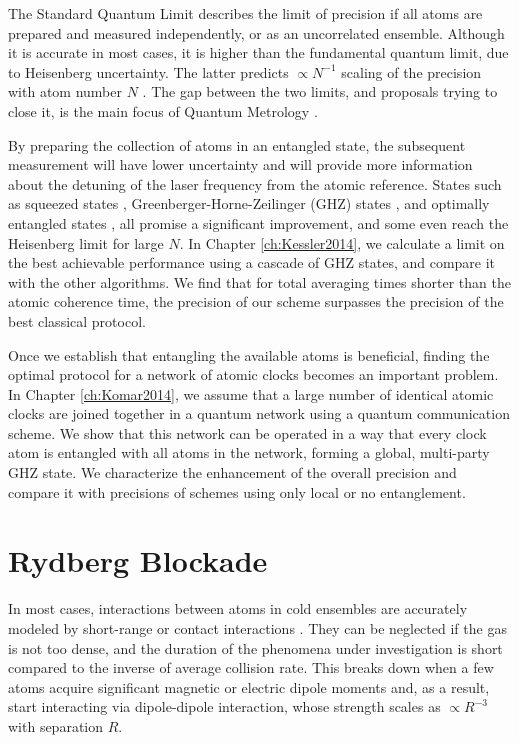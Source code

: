 The Standard Quantum Limit describes the limit of precision if all atoms are
prepared and measured independently, or as an uncorrelated ensemble. Although it
is accurate in most cases, it is higher than the fundamental quantum limit, due
to Heisenberg uncertainty. The latter predicts $\propto N^{-1}$ scaling of the
precision with atom number $N$ \cite{Hall2012}. The gap between the
two limits, and proposals trying to close it, is the main focus of
Quantum Metrology \cite{Giovanetti2011, Escher:2011fn}.

By preparing the collection of atoms in an
entangled state, the subsequent measurement will have lower uncertainty and will
provide more information about the detuning of the laser frequency from the
atomic reference. States such as squeezed states \cite{Andre2004,
Borregaard2013_nearHeisenberg}, Greenberger-Horne-Zeilinger (GHZ) states
\cite{Wineland1998, Bollinger1996}, and optimally entangled states
\cite{Buzek1999, Berry2009}, all promise a significant improvement, and some
even reach the Heisenberg limit for large $N$. In Chapter \ref{ch:Kessler2014},
we calculate a limit on the best achievable performance using a cascade of GHZ
states, and compare it with the other algorithms. We find that for total
averaging times shorter than the atomic coherence time, the precision of our
scheme surpasses the precision of the best classical protocol.

Once we establish that entangling the available atoms is beneficial, finding the
optimal protocol for a network of atomic clocks becomes an important problem. In
Chapter \ref{ch:Komar2014}, we assume that a large number of identical atomic
clocks are joined together in a quantum network using a quantum communication
scheme. We show that this network can be operated in a way that every clock
atom is entangled with all atoms in the network, forming a global, multi-party
GHZ state. We characterize the enhancement of the overall precision and compare
it with precisions of schemes using only local or no entanglement.





\section{Rydberg Blockade}
In most cases, interactions between atoms in cold ensembles are accurately
modeled by short-range or contact interactions \cite{Cheng2010}.
They can be neglected if the gas is not too dense, and the duration of the
phenomena under investigation is short compared to the inverse of average
collision rate. This breaks down when a few atoms acquire significant magnetic
or electric dipole moments and, as a result, start interacting via dipole-dipole
interaction, whose strength scales as $\propto R^{-3}$ with separation $R$.

